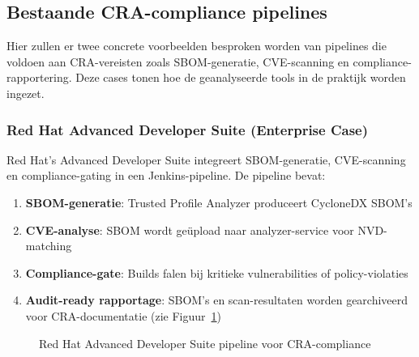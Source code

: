 \subsection{Bestaande CRA-compliance pipelines}

Hier zullen er twee concrete voorbeelden besproken worden van pipelines die voldoen aan CRA-vereisten zoals SBOM-generatie, CVE-scanning en compliance-\\rapportering. Deze cases tonen hoe de geanalyseerde tools in de praktijk worden ingezet.

\subsubsection{Red Hat Advanced Developer Suite (Enterprise Case)}

Red Hat's Advanced Developer Suite integreert SBOM-generatie, CVE-scanning en compliance-gating in een Jenkins-pipeline. De pipeline bevat:
\begin{enumerate}
  \item \textbf{SBOM-generatie}: Trusted Profile Analyzer produceert CycloneDX SBOM's
  \item \textbf{CVE-analyse}: SBOM wordt geüpload naar analyzer-service voor NVD-matching
  \item \textbf{Compliance-gate}: Builds falen bij kritieke vulnerabilities of policy-violaties
  \item \textbf{Audit-ready rapportage}: SBOM's en scan-resultaten worden gearchiveerd voor CRA-documentatie (zie Figuur~\ref{fig:redhat-pipeline})
\end{enumerate}


\begin{figure}[h]
  \centering
  \caption{Red Hat Advanced Developer Suite pipeline voor CRA-compliance}
  \label{fig:redhat-pipeline}
\end{figure}

